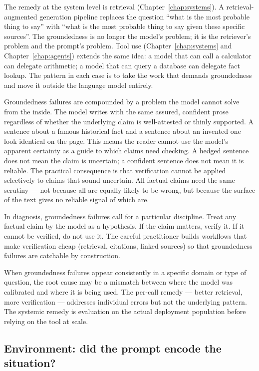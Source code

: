 The remedy at the system level is retrieval (Chapter~\ref{chap:systems}). A
retrieval-augmented generation pipeline replaces the question
``what is the most probable thing to say'' with ``what is the
most probable thing to say given these specific sources''.
The groundedness is no longer the model's problem; it is the
retriever's problem and the prompt's problem. Tool use
(Chapter~\ref{chap:systems} and Chapter~\ref{chap:agents}) extends the same idea: a model
that can call a calculator can delegate arithmetic; a model
that can query a database can delegate fact lookup. The
pattern in each case is to take the work that demands
groundedness and move it outside the language model entirely.

Groundedness failures are compounded by a problem the model
cannot solve from the inside. The model writes with the same
assured, confident prose regardless of whether the underlying
claim is well-attested or thinly supported. A sentence about
a famous historical fact and a sentence about an invented one
look identical on the page. This means the reader cannot use
the model's apparent certainty as a guide to which claims
need checking. A hedged sentence does not mean the claim is
uncertain; a confident sentence does not mean it is reliable.
The practical consequence is that verification cannot be
applied selectively to claims that sound uncertain. All
factual claims need the same scrutiny --- not because all are
equally likely to be wrong, but because the surface of the
text gives no reliable signal of which are.

In diagnosis, groundedness failures call for a particular
discipline. Treat any factual claim by the model as a
hypothesis. If the claim matters, verify it. If it cannot be
verified, do not use it. The careful practitioner builds
workflows that make verification cheap (retrieval, citations,
linked sources) so that groundedness failures are catchable by
construction.

When groundedness failures appear consistently in a specific
domain or type of question, the root cause may be a mismatch
between where the model was calibrated and where it is being
used. The per-call remedy --- better retrieval, more
verification --- addresses individual errors but not the
underlying pattern. The systemic remedy is evaluation on the
actual deployment population before relying on the tool at
scale.

\subsection*{Environment: did the prompt encode the situation?}

